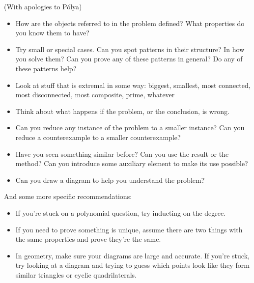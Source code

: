 (With apologies to P\'olya)
\begin{itemize}
  \item How are the objects referred to in the problem defined? What properties
    do you know them to have?
  \item Try small or special cases. Can you spot patterns in their structure? In
    how you solve them? Can you prove any of these patterns in general? Do any
    of these patterns help?
  \item Look at stuff that is extremal in some way: biggest, smallest, most
    connected, most disconnected, most composite, prime, whatever
  \item Think about what happens if the problem, or the conclusion, is wrong.
  \item Can you reduce any instance of the problem to a smaller instance? 
    Can you reduce a counterexample to a smaller counterexample?
  \item Have you seen something similar before? Can you use the result or the
    method? Can you introduce some auxiliary element to make its use possible?
  \item Can you draw a diagram to help you understand the problem?
\end{itemize}
And some more specific recommendations:
\begin{itemize}
  \item If you're stuck on a polynomial question, try inducting on the degree.
  \item If you need to prove something is unique, assume there are two things
    with the same properties and prove they're the same.
  \item In geometry, make sure your diagrams are large and accurate. If you're
    stuck, try looking at a diagram and trying to guess which points look like
    they form similar triangles or cyclic quadrilaterals.
\end{itemize}
